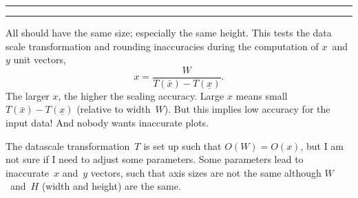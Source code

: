 \starttikzpicture
\startaxis
\smallplotstest
\stopaxis
\stoptikzpicture


\starttikzpicture
\startaxis[width=5cm]
\smallplotstest
\stopaxis
\stoptikzpicture

\starttikzpicture
\startaxis[width=\linewidth]
\smallplotstest
\stopaxis
\stoptikzpicture

\starttikzpicture
\startaxis[height=\textheight,width=\linewidth]
\smallplotstest
\stopaxis
\stoptikzpicture

\starttikzpicture
\startaxis[height=3cm]
\smallplotstest
\stopaxis
\stoptikzpicture

\hrule width3cm height1pt
\vskip10pt
\starttikzpicture[baseline]
\startaxis[x=3cm]
\smallplotstest
\stopaxis
\stoptikzpicture

\hrule width3cm height1pt
\noindent
\vrule height4cm width1pt
\hskip10pt
\starttikzpicture[baseline]
\startaxis[x=3cm,y=4cm]
\smallplotstest
\stopaxis
\stoptikzpicture

\noindent
\vrule height3cm width1pt
\hskip10pt
\starttikzpicture[baseline]
\startaxis[y=3cm]
\smallplotstest
\stopaxis
\stoptikzpicture

All should have the same size; especially the same height.
This tests the data scale transformation and rounding inaccuracies during the computation of $x$~and~$y$ unit vectors,
$$ x = \frac{W}{T(\bar x) - T(\underline x)}. $$
The larger $x$, the higher the scaling accuracy. Large $x$ means small $T(\bar x) - T(\underline x)$ (relative to width~$W$). But this implies low accuracy for the input data! And nobody wants inaccurate plots.

The datascale transformation~$T$ is set up such that $O(W) = O(x)$, but I am not sure if I need to adjust some parameters. Some parameters lead to inaccurate~$x$ and~$y$ vectors, such that axis sizes are {not} the same although $W$~and~$H$ (width and height) are the same.

